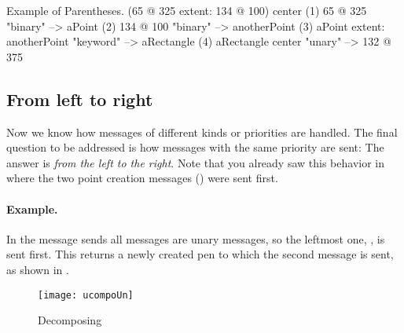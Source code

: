 \documentclass[a4paper,10pt,twoside]{book}
\begin{document}
\begin{example}[decExtent]{Example of Parentheses.}{}
      (65 @ 325 extent: 134 @ 100) center
(1)   65 @ 325                                                    "binary"
    --> aPoint
(2)                                  134 @ 100                     "binary"
                                 --> anotherPoint
(3)   aPoint extent: anotherPoint                       "keyword"
      --> aRectangle
(4)   aRectangle center                                     "unary"
      --> 132 @ 375
\end{example}

\subsection{From left to right}
Now we know how messages of different kinds or priorities are handled.
The final question to be addressed is how messages with the same priority are sent:
The answer is \emph{from the left to the right}. Note that you already saw this behavior in  where the two point creation messages () were sent first.



\paragraph{Example.}
In the message sends  all messages are unary messages, so the leftmost one, , is sent first.
This returns a newly created pen to which the second message  is sent, as shown in .

\begin{figure}
	\centering
	\texttt{[image: ucompoUn]}
	\caption{Decomposing \label{fig:unaryMessages}}
\end{figure}

\end{document}
